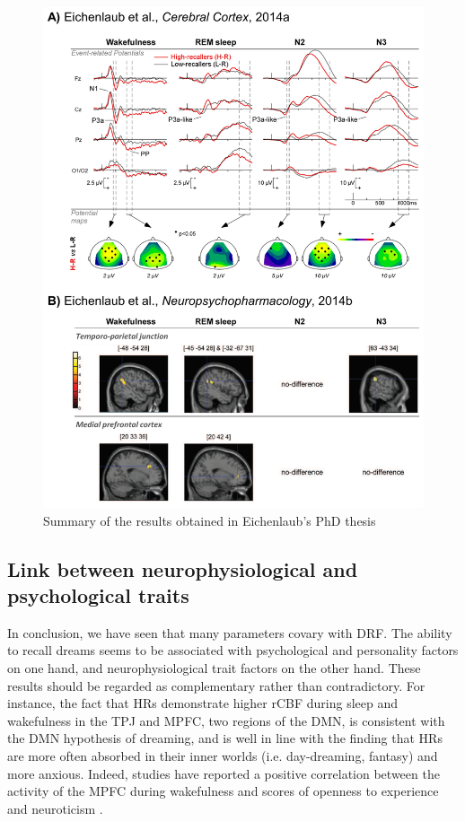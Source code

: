 \begin{figure}[!htb]
	\includegraphics[width=\textwidth]{Fig/Intro/Intro_JBE_summary/Intro_JBE_summary.png}
	\caption[Summary of the results obtained in Eichenlaub's PhD thesis]{Summary of the results obtained in Eichenlaub's PhD thesis}
	\label{fig:intro:jbe-summary}
\end{figure}

\subsection{Link between neurophysiological and psychological traits}
\label{sec:dream-recall:param:link}

In conclusion, we have seen that many parameters covary with DRF. The ability to recall dreams seems to be associated with psychological and personality factors on one hand, and neurophysiological trait factors on the other hand. These results should be regarded as complementary rather than contradictory. For instance, the fact that HRs demonstrate higher rCBF during sleep and wakefulness in the TPJ and MPFC, two regions of the DMN, is consistent with the DMN hypothesis of dreaming, and is well in line with the finding that HRs are more often absorbed in their inner worlds (i.e. day-dreaming, fantasy) and more anxious. Indeed, studies have reported a positive correlation between the activity of the MPFC during wakefulness and scores of openness to experience \citep{sutin_sex_2009} and neuroticism \citep{zald_brain_2002}.

